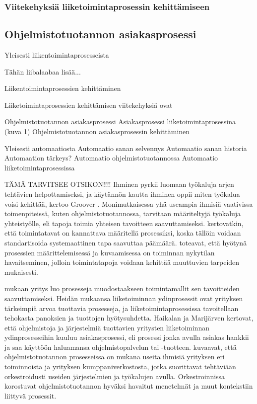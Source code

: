 \documentclass[finnish,12pt,a4paper,pdftex]{article}
\begin{document}
\subsubsection{Viitekehyksiä liiketoimintaprosessin kehittämiseen}

\subsection{Ohjelmistotuotannon asiakasprosessi}
Yleisesti liikentoimintaprosesseista

Tähän liibalaabaa lisää...

        Liikentoimintaprosessien kehittäminen
   
Liiketoimintaprosessien kehittämisen viitekehyksiä ovat 
        
 
 
Ohjelmistotuotannon asiakasprosessi
         Asiakasprosessi liiketoimintaprosessina (kuva 1)
         Ohjelmistotuotannon asiakasprosessin kehittäminen
         
         
         
         
Yleisesti automaatiosta
        Automaatio sanan selvennys
        Automaatio sanan historia
        Automaation tärkeys?
        Automaatio ohjelmistotuotannossa
        Automaatio liiketoimintaprosessissa

 
 
 
 
TÄMÄ TARVITSEE OTSIKON!!!!
Ihminen pyrkii luomaan työkaluja arjen tehtävien helpottamiseksi, ja käytännön kautta ihminen oppii miten työkalua voisi kehittää, kertoo Groover \citeyearpar{groover}. Monimutkaisessa yhä useampia ihmisiä vaativissa toimenpiteissä, kuten ohjelmistotuotannossa, tarvitaan määriteltyjä työkaluja yhteistyölle, eli tapoja toimia yhteisen tavoitteen saavuttamiseksi. \citeauthor{leanit} \citeyearpar{leanit} kertovatkin, että toimintatavat on kannattava määritellä prosessiksi, koska tällöin voidaan standartisoida systemaattinen tapa saavuttaa päämäärä. \citeauthor{leanit} toteavat, että hyötynä prosessien määrittelemisessä ja kuvaamisessa on toiminnan nykytilan havaitseminen, jolloin toimintatapoja voidaan kehittää muuttuvien tarpeiden mukaisesti.

\cite{teollisuustalous} mukaan yritys luo prosesseja muodostaakseen toimintamallit sen tavoitteiden saavuttamiseksi. Heidän mukaansa liiketoiminnan ydinprosessit ovat yrityksen tärkeimpiä arvoa tuottavia prosesseja, ja liiketoimintaprosessissa tavoitellaan tehokasta panoksien ja tuottojen hyötysuhdetta. Haikalan ja Marijärven \citeyearpar{ohjelmistotuotanto} kertovat, että ohjelmistoja ja järjestelmiä tuottavien yritysten liiketoiminnan ydinprosesseihin kuuluu asiakasprosessi, eli prosessi jonka avulla asiakas hankkii ja saa käyttöön haluamansa ohjelmistopalvelun tai -tuotteen. \cite{okaytannot} kuvaavat, että ohjelmistotuotannon prosesseissa on mukana useita ihmisiä yrityksen eri toiminnoista ja yrityksen kumppaniverkostosta, jotka suorittavat tehtäviään orkestroidusti useiden järjestelmien ja työkalujen avulla. Orkestroinnissa korostuvat ohjelmistotuotannon hyväksi havaitut menetelmät ja muut kontekstiin liittyvä prosessit.
 
\end{document}
